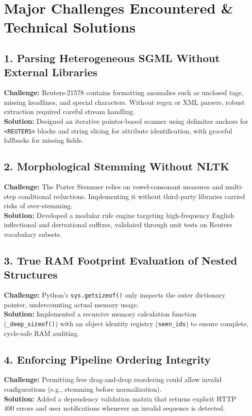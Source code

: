 \documentclass[11pt,a4paper]{article}
\begin{document}
\section{Major Challenges Encountered \& Technical Solutions}

\subsection{1. Parsing Heterogeneous SGML Without External Libraries}
\textbf{Challenge:} Reuters-21578 contains formatting anomalies such as unclosed tags, missing headlines, and special characters. Without regex or XML parsers, robust extraction required careful stream handling.\\
\textbf{Solution:} Designed an iterative pointer-based scanner using delimiter anchors for \texttt{<REUTERS>} blocks and string slicing for attribute identification, with graceful fallbacks for missing fields.

\subsection{2. Morphological Stemming Without NLTK}
\textbf{Challenge:} The Porter Stemmer relies on vowel-consonant measures and multi-step conditional reductions. Implementing it without third-party libraries carried risks of over-stemming.\\
\textbf{Solution:} Developed a modular rule engine targeting high-frequency English inflectional and derivational suffixes, validated through unit tests on Reuters vocabulary subsets.

\subsection{3. True RAM Footprint Evaluation of Nested Structures}
\textbf{Challenge:} Python's \texttt{sys.getsizeof()} only inspects the outer dictionary pointer, undercounting actual memory usage.\\
\textbf{Solution:} Implemented a recursive memory calculation function (\texttt{\_deep\_sizeof()}) with an object identity registry (\texttt{seen\_ids}) to ensure complete, cycle-safe RAM auditing.

\subsection{4. Enforcing Pipeline Ordering Integrity}
\textbf{Challenge:} Permitting free drag-and-drop reordering could allow invalid configurations (e.g., stemming before normalization).\\
\textbf{Solution:} Added a dependency validation matrix that returns explicit HTTP 400 errors and user notifications whenever an invalid sequence is detected.
\end{document}
